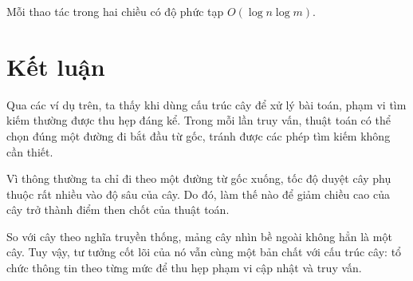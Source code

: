 \documentclass[11pt]{article}
\begin{document}
Mỗi thao tác trong hai chiều có độ phức tạp \(O(\log n\log m)\).

\section{Kết luận}

Qua các ví dụ trên, ta thấy khi dùng cấu trúc cây để xử lý bài toán, phạm vi
tìm kiếm thường được thu hẹp đáng kể. Trong mỗi lần truy vấn, thuật toán có
thể chọn đúng một đường đi bắt đầu từ gốc, tránh được các phép tìm kiếm không
cần thiết.

Vì thông thường ta chỉ đi theo một đường từ gốc xuống, tốc độ duyệt cây phụ
thuộc rất nhiều vào độ sâu của cây. Do đó, làm thế nào để giảm chiều cao của
cây trở thành điểm then chốt của thuật toán.

So với cây theo nghĩa truyền thống, mảng cây nhìn bề ngoài không hẳn là một
cây. Tuy vậy, tư tưởng cốt lõi của nó vẫn cùng một bản chất với cấu trúc cây:
tổ chức thông tin theo từng mức để thu hẹp phạm vi cập nhật và truy vấn.
\end{document}
